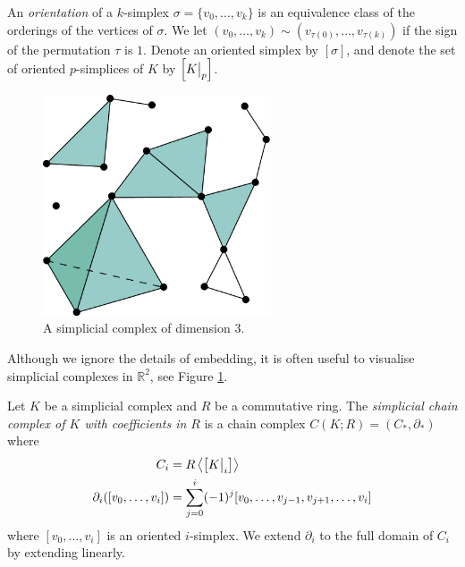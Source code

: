 An \emph{orientation} of a $k$-simplex $\sigma = \{v_0, \ldots, v_k\}$ is an equivalence class of the orderings of the vertices of $\sigma$. We let $(v_0, \ldots, v_k) \sim (v_{\tau(0)}, \ldots, v_{\tau(k)})$ if the sign of the permutation $\tau$ is $1$. Denote an oriented simplex by $[\sigma]$, and denote the set of oriented $p$-simplices of $K$ by $\left[\restr Kp\right]$.

\begin{figure}
    \centering
    \includegraphics[width=0.6\textwidth]{content/2-background/images/simplicial-complex}
    \caption{A simplicial complex of dimension $3$.}
    \label{fig:simplicial-complex}
\end{figure}

Although we ignore the details of embedding, it is often useful to visualise simplicial complexes in $\mathbb R^2$, see Figure \ref{fig:simplicial-complex}.

\begin{definition}
    \label{def:simplicial-chain-complex}
    Let $K$ be a simplicial complex and $R$ be a commutative ring. The \emph{simplicial chain complex of $K$ with coefficients in $R$} is a chain complex $C(K; R) = (C_*, \partial_*)$ where
    \begin{align*}
        C_i                            & = R \left\langle \left[\restr{K}{i}\right] \right\rangle           \\
        \partial_i([v_0, \ldots, v_i]) & = \sum_{j=0}^i (-1)^j [v_0, \ldots, v_{j-1}, v_{j+1}, \ldots, v_i]
    \end{align*}
    where $[v_0, \ldots, v_i]$ is an oriented $i$-simplex. We extend $\partial_i$ to the full domain of $C_i$ by extending linearly.
\end{definition}


